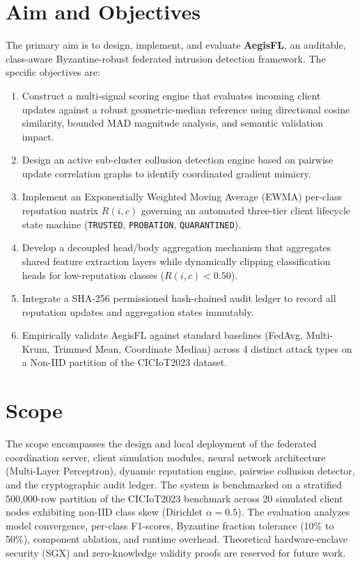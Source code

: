 \documentclass[12pt,a4paper]{report}
\begin{document}
\section{Aim and Objectives}
The primary aim is to design, implement, and evaluate \textbf{AegisFL}, an auditable, class-aware Byzantine-robust federated intrusion detection framework. The specific objectives are:
\begin{enumerate}
    \item Construct a multi-signal scoring engine that evaluates incoming client updates against a robust geometric-median reference using directional cosine similarity, bounded MAD magnitude analysis, and semantic validation impact.
    \item Design an active sub-cluster collusion detection engine based on pairwise update correlation graphs to identify coordinated gradient mimicry.
    \item Implement an Exponentially Weighted Moving Average (EWMA) per-class reputation matrix $R(i, c)$ governing an automated three-tier client lifecycle state machine (\texttt{TRUSTED}, \texttt{PROBATION}, \texttt{QUARANTINED}).
    \item Develop a decoupled head/body aggregation mechanism that aggregates shared feature extraction layers while dynamically clipping classification heads for low-reputation classes ($R(i,c) < 0.50$).
    \item Integrate a SHA-256 permissioned hash-chained audit ledger to record all reputation updates and aggregation states immutably.
    \item Empirically validate AegisFL against standard baselines (FedAvg, Multi-Krum, Trimmed Mean, Coordinate Median) across 4 distinct attack types on a Non-IID partition of the CICIoT2023 dataset.
\end{enumerate}

\section{Scope}
The scope encompasses the design and local deployment of the federated coordination server, client simulation modules, neural network architecture (Multi-Layer Perceptron), dynamic reputation engine, pairwise collusion detector, and the cryptographic audit ledger. The system is benchmarked on a stratified 500,000-row partition of the CICIoT2023 benchmark across 20 simulated client nodes exhibiting non-IID class skew (Dirichlet $\alpha=0.5$). The evaluation analyzes model convergence, per-class F1-scores, Byzantine fraction tolerance (10\% to 50\%), component ablation, and runtime overhead. Theoretical hardware-enclave security (SGX) and zero-knowledge validity proofs are reserved for future work.
\end{document}
